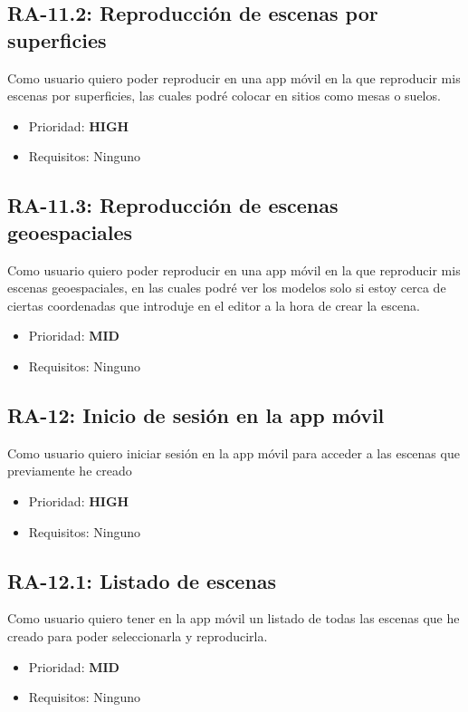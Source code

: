\subsection{RA-11.2: Reproducción de escenas por superficies}
Como usuario quiero poder reproducir en una app móvil en la que reproducir mis escenas por superficies, las cuales podré colocar en sitios como mesas o suelos. 

\begin{itemize}
    \item Prioridad: \textbf{HIGH}
    \item Requisitos: Ninguno
\end{itemize}

\subsection{RA-11.3: Reproducción de escenas geoespaciales}
Como usuario quiero poder reproducir en una app móvil en la que reproducir mis escenas geoespaciales, en las cuales podré ver los modelos solo si estoy cerca de ciertas coordenadas que introduje en el editor a la hora de crear la escena.

\begin{itemize}
    \item Prioridad: \textbf{MID}
    \item Requisitos: Ninguno
\end{itemize}

\subsection{RA-12: Inicio de sesión en la app móvil}
Como usuario quiero iniciar sesión en la app móvil para acceder a las escenas que previamente he creado

\begin{itemize}
    \item Prioridad: \textbf{HIGH}
    \item Requisitos: Ninguno
\end{itemize}

\subsection{RA-12.1: Listado de escenas}
Como usuario quiero tener en la app móvil un listado de todas las escenas que he creado para poder seleccionarla y reproducirla.

\begin{itemize}
    \item Prioridad: \textbf{MID}
    \item Requisitos: Ninguno
\end{itemize}

